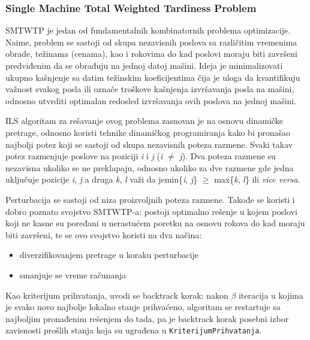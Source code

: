 \documentclass[a4paper]{article}
\newcommand{\kriterijum}[0]{\small{\texttt{KriterijumPrihvatanja}}}
\begin{document}
\subsubsection{Single Machine Total Weighted Tardiness Problem}
SMTWTP je jedan od fundamentalnih kombinatornih problema optimizacije. Naime, problem se sastoji od skupa nezavisnih poslova sa različitim vremenima obrade, težinama (cenama), kao i rokovima do kad poslovi moraju biti završeni predviđenim da se obrađuju na jednoj datoj mašini. Ideja je minimalizovati ukupno kašnjenje sa datim težinskim koeficijentima čija je uloga da kvantifikuju važnost svakog posla ili označe troškove kašnjenja izvršavanja posla na mašini, odnosno utvrditi optimalan redosled izvršavanja ovih poslova na jednoj mašini.
\cite{handbookOfMetaheuristics}

ILS algoritam za rešavanje ovog problema zasnovan je na osnovu dinamičke pretrage, odnosno koristi tehnike dinamičkog programiranja kako bi pronašao najbolji potez koji se sastoji od skupa nezavisnih poteza razmene. Svaki takav potez razmenjuje poslove na poziciji \textit{i} i \textit{j} (\textit{i} $\ne$ \textit{j}). Dva poteza razmene su nezavisna ukoliko se ne preklapaju, odnosno ukoliko za dve razmene gde jedna uključuje pozicije \textit{i}, \textit{j} a druga \textit{k}, \textit{l} važi da je\linebreak min\{\textit{i}, \textit{j}\} $\geq$ max\{\textit{k}, \textit{l}\} ili \textit{vice versa}.

Perturbacija se sastoji od niza proizvoljnih poteza razmene. Takođe se koristi i dobro poznato svojstvo SMTWTP-a: postoji optimalno rešenje u kojem poslovi koji ne kasne su poređani u nerastućem poretku na osnovu rokova do kad moraju biti završeni, te se ovo svojstvo koristi na dva načina:
\begin{itemize}
  \item diverzifikovanjem pretrage u koraku perturbacije
  \item smanjuje se vreme računanja
\end{itemize}
Kao kriterijum prihvatanja, uvodi se backtrack korak: nakon $\beta$ iteracija u kojima je svako novo najbolje lokalno stanje prihvaćeno, algoritam se restartuje sa najboljim pronađenim rešenjem do tada, pa je backtrack korak posebni izbor zavisnosti prošlih stanja koja su ugrađena u \kriterijum. \cite{designOfIteratedLocalSearchAlgorithms}
\end{document}
